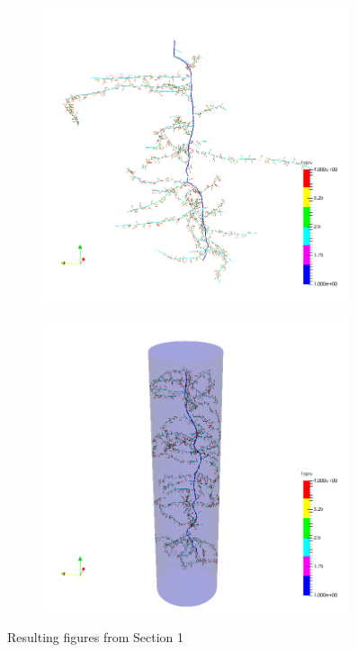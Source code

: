 \begin{figure}
\begin{subfigure}[c]{0.5\textwidth}
\includegraphics[width=0.99\textwidth]{example_1a.png}
 \label{fig:basicA}
\end{subfigure}
\begin{subfigure}[c]{0.5\textwidth}
\includegraphics[width=0.99\textwidth]{example_1b.png}
 \label{fig:basicB}
\end{subfigure}
\caption{Resulting figures from Section 1} 
\end{figure}

